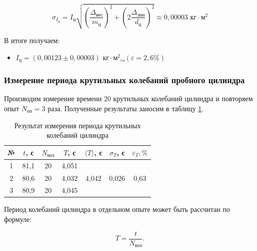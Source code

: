 \documentclass[a4paper,12pt]{article} %
\begin{document}
\begin{equation}
\sigma_{I_\text{ц}} = I_\text{ц}\sqrt{\left( \frac{\Delta_\text{вес}}{m_\text{ц}} \right)^2 + \left(2 \frac{\Delta_\text{лин}}{d_\text{ц}} \right)^2 } \approx 0,00003 \text{ кг} \cdot \text{м}^2
\end{equation}

В итоге получаем:

\begin{itemize}
	\item \underline{$ I_\text{ц} = \left(0,00123 \pm 0,00003 \right) \text{ кг} \cdot \text{м}^2 $, $ \left( \varepsilon = 2,6 \% \right) $}
\end{itemize}

\subsubsection{Измерение периода крутильных колебаний пробного цилиндра}

Производим измерение времени 20 крутильных колебаний цилиндра и повторяем опыт $ N_\text{оп} = 3 $ раза. Полученные результаты заносим в таблицу \ref{krut_cil}.

\begin{table}[H]
	\centering
	\begin{tabular}{|c|c|c|c|c|c|c|}
		\hline
		№ & $ t $, с & $ N_\text{кол} $ & $ T $, с & $ \langle T \rangle $, с                & $ \sigma_T $, с             & $ \varepsilon_T, \% $                      \\ \hline
		1 & 81,1 & 20              & 4,051      & \multirow{3}{*}{4,042} & \multirow{3}{*}{0,026} & \multirow{3}{*}{0,63} \\ \cline{1-4}
		2 & 80,6 & 20              & 4,032      &                        &                        &                            \\ \cline{1-4}
		3 & 80,9 & 20              & 4,045     &                        &                        &                            \\ \hline
	\end{tabular}
	\caption{Результат измерения периода крутильных колебаний цилиндра}
	\label{krut_cil}
\end{table}

\label{formuli}

Период колебаний цилиндра в отдельном опыте может быть рассчитан по формуле:

\begin{equation}
T = \frac{t}{N_\text{кол}}.
\end{equation}
\end{document}
